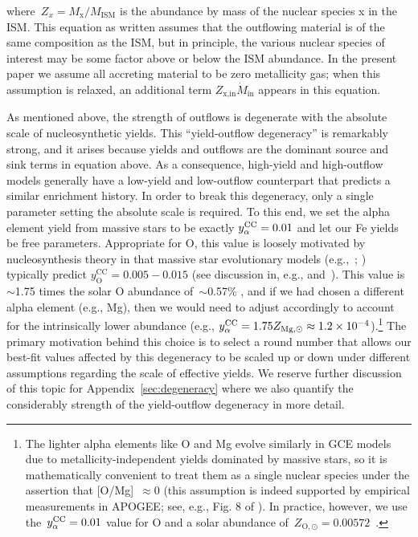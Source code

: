 where~$Z_x = M_\text{x} / M_\text{ISM}$ is the abundance by mass of the nuclear
species x in the ISM.
This equation as written assumes that the outflowing material is of the same
composition as the ISM, but in principle, the various nuclear species of
interest may be some factor above or below the ISM abundance.
In the present paper we assume all accreting material to be zero metallicity
gas; when this assumption is relaxed, an additional term
$Z_\text{x,in}\dot{M}_\text{in}$ appears in this equation.
\par
As mentioned above, the strength of outflows is degenerate with the absolute
scale of nucleosynthetic yields.
This ``yield-outflow degeneracy'' is remarkably strong, and it arises because
yields and outflows are the dominant source and sink terms in equation
 above.
As a consequence, high-yield and high-outflow models generally have a
low-yield and low-outflow counterpart that predicts a similar enrichment
history.
In order to break this degeneracy, only a single parameter setting the absolute
scale is required.
To this end, we set the alpha element yield from massive stars to be exactly
$y_\alpha^\text{CC} = 0.01$ and let our Fe yields be free parameters.
Appropriate for O, this value is loosely motivated by nucleosynthesis theory in
that massive star evolutionary models (e.g.,~\citealp*{Nomoto2013};
\citealp{Sukhbold2016, Limongi2018}) typically predict
$y_\text{O}^\text{CC} = 0.005 - 0.015$ (see discussion in, e.g.,
\citealp{Weinberg2017b} and~\citealp{Johnson2020}).
This value is~$\sim$1.75 times the solar O abundance of~$\sim$0.57\%
\citep{Asplund2009}, and if we had chosen a different alpha element (e.g., Mg),
then we would need to adjust accordingly to account for the intrinsically lower
abundance (e.g., $y_\alpha^\text{CC} = 1.75 Z_{\text{Mg},\odot} \approx
1.2\times10^{-4}$).\footnote{
	The lighter alpha elements like O and Mg evolve similarly in GCE models due
	to metallicity-independent yields dominated by massive stars, so it is
	mathematically convenient to treat them as a single nuclear species
	under the assertion that [O/Mg]~$\approx 0$ (this assumption is indeed
	supported by empirical measurements in APOGEE; see, e.g., Fig. 8 of
	\citealt{Weinberg2019}).
	In practice, however, we use the~$y_\alpha^\text{CC} = 0.01$ value for O and a solar
	abundance of~$Z_{\text{O},\odot} = 0.00572$~\citep{Asplund2009}.
}
The primary motivation behind this choice is to select a round number that
allows our best-fit values affected by this degeneracy to be scaled up or down
under different assumptions regarding the scale of effective yields.
We reserve further discussion of this topic for Appendix~\ref{sec:degeneracy}
where we also quantify the considerably strength of the yield-outflow
degeneracy in more detail.

